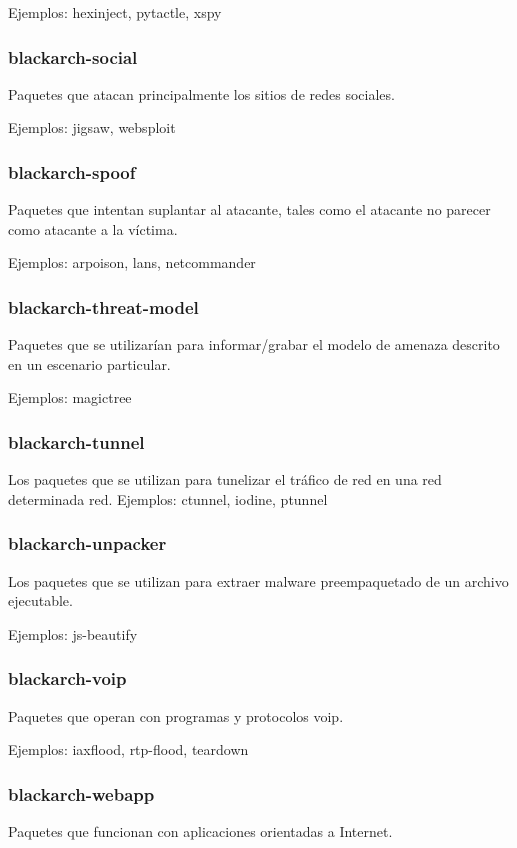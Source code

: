 \documentclass[a4paper, oneside, 11pt]{book}
\begin{document}
Ejemplos: hexinject, pytactle, xspy

\subsubsection{blackarch-social}
Paquetes que atacan principalmente los sitios de redes sociales.

Ejemplos: jigsaw, websploit

\subsubsection{blackarch-spoof}
Paquetes que intentan suplantar al atacante, tales como
el atacante no parecer como atacante a la víctima.

Ejemplos: arpoison, lans, netcommander

\subsubsection{blackarch-threat-model}
Paquetes que se utilizar\'ian para informar/grabar el
modelo de amenaza descrito en un escenario particular.

Ejemplos: magictree

\subsubsection{blackarch-tunnel}
Los paquetes que se utilizan para tunelizar el tráfico de red en una red determinada
red.
Ejemplos: ctunnel, iodine, ptunnel

\subsubsection{blackarch-unpacker}
Los paquetes que se utilizan para extraer malware preempaquetado de un archivo
ejecutable.

Ejemplos: js-beautify

\subsubsection{blackarch-voip}
Paquetes que operan con programas y protocolos voip.

Ejemplos: iaxflood, rtp-flood, teardown

\subsubsection{blackarch-webapp}
Paquetes que funcionan con aplicaciones orientadas a Internet.
\end{document}
